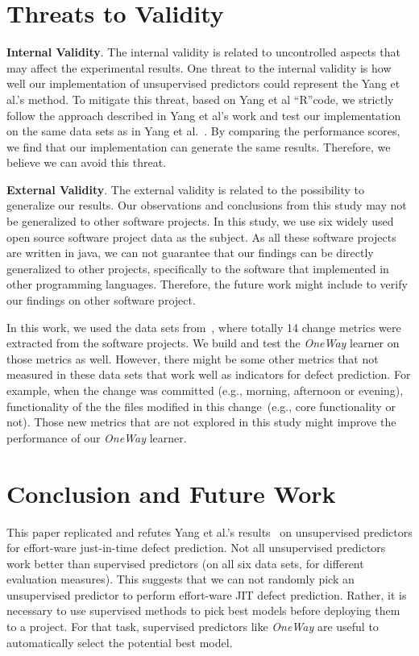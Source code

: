 \documentclass[sigconf]{acmart}
\theoremstyle{break}
\begin{document}
\section{Threats to Validity}\label{threats}
 
\textbf{Internal Validity}. The internal validity is related to uncontrolled
aspects that may affect the experimental results. One threat to the internal validity
is how well our implementation of unsupervised predictors could represent 
the Yang et al.'s method. To mitigate this threat, based on Yang et al ``R''code, we strictly follow 
the approach described in Yang et al's work and test our implementation on the
same data sets as in Yang et al.~\cite{yang2016effort}. By comparing the performance
scores, we find that our implementation can generate the same results. Therefore,
we believe we can avoid this threat.

\textbf{External Validity}. The external validity is related to the
possibility to generalize our results. Our observations and conclusions
from this study may not be generalized to other software projects. In this study,
we use six widely used open source software project data as the subject.
As all these software projects are written in java, we can not  guarantee that
our findings can be directly generalized to other projects,
specifically to the software that implemented in other programming
languages. Therefore, the future work might include to verify our findings on 
other software project.

In this work, we used the data sets from~\cite{yang2016effort,kamei2013large}, where
totally 14 change metrics were extracted from the software projects.  We build and test the
{\it OneWay} learner on those metrics as well. However, there might be some other metrics
that not measured in these data sets that work well as indicators for defect prediction.
For example, when the change was committed (e.g., morning, afternoon or evening),
functionality of the the files modified in this change~(e.g., core functionality or not).
Those new metrics that are not explored in this study might improve the performance of 
our {\it OneWay} learner.


\section{Conclusion and Future Work}\label{conclusion}

This paper replicated and refutes Yang et al.'s results~\cite{yang2016effort}
on unsupervised predictors for effort-ware just-in-time 
defect prediction. Not all unsupervised predictors
work better than supervised predictors (on all six data sets, for different evaluation
measures). This suggests that we can not randomly pick an  unsupervised predictor
to perform effort-ware JIT defect prediction.  
Rather, it is necessary to use supervised methods to  pick   best models before deploying them to a project.
For that task, supervised predictors like {\it OneWay} are useful
to automatically
select the potential best model.
\end{document}

